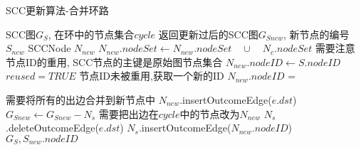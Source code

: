 \documentclass{article}
\begin{document}
\begin{algorithm}
\caption{SCC更新算法-合并环路}
\begin{algorithmic}[1]
\Require SCC图$G_S$, 在环中的节点集合$cycle$
\Ensure 返回更新过后的SCC图$G_{Snew}$, 新节点的编号$S_{new}$
        \State SCCNode $N_{new}$
            \State $N_{new}.nodeSet \gets  N_{new}.nodeSet \quad \cup \quad N_c.nodeSet$
        \EndFor
        \State \Comment 需要注意节点ID的重用, SCC节点的主键是原始图节点集合
                \State $N_{new}.nodeID \gets S.nodeID$ 
                \State $reused = TRUE$
            \EndIf
        \EndFor
         \Comment 节点ID未被重用,获取一个新的ID
            \State $N_{new}.nodeID$ = 
        \EndIf

             \Comment 需要将所有的出边合并到新节点中
                    \State $N_{new}$.insertOutcomeEdge($e.dst$)
                \EndFor
                $G_{Snew} \gets G_{Snew} - N_s$
            \Else \Comment 需要把出边在$cycle$中的节点改为$N_{new}$
                        \State $N_s$.deleteOutcomeEdge($e.dst$)
                    \EndIf
                \EndFor
                    \State $N_s$.insertOutcomeEdge($N_{new}.nodeID$)
                \EndIf
            \EndIf
        \EndFor
        \State \Return $G_S , S_{new}.nodeID$ 
    \EndFunction

\end{algorithmic}
\end{algorithm}
\end{document}
